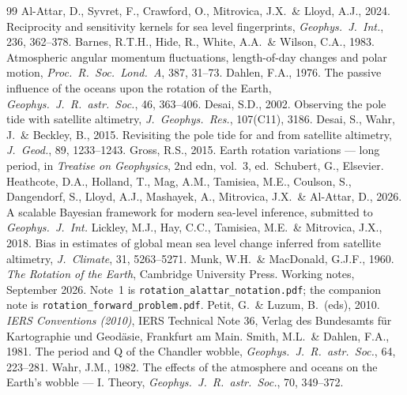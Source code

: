 \documentclass[11pt,a4paper]{article}
\begin{document}
\begin{thebibliography}{99}
 Al-Attar, D., Syvret, F., Crawford, O., Mitrovica, J.X.\ \& Lloyd, A.J., 2024.
Reciprocity and sensitivity kernels for sea level fingerprints, \emph{Geophys.\ J.\ Int.}, 236, 362--378.
 Barnes, R.T.H., Hide, R., White, A.A.\ \& Wilson, C.A., 1983. Atmospheric angular
momentum fluctuations, length-of-day changes and polar motion, \emph{Proc.\ R.\ Soc.\ Lond.\ A}, 387, 31--73.
 Dahlen, F.A., 1976. The passive influence of the oceans upon the rotation of the
Earth, \emph{Geophys.\ J.\ R.\ astr.\ Soc.}, 46, 363--406.
 Desai, S.D., 2002. Observing the pole tide with satellite altimetry, \emph{J.\ Geophys.\
Res.}, 107(C11), 3186.
 Desai, S., Wahr, J.\ \& Beckley, B., 2015. Revisiting the pole tide for and from satellite
altimetry, \emph{J.\ Geod.}, 89, 1233--1243.
 Gross, R.S., 2015. Earth rotation variations --- long period, in \emph{Treatise on
Geophysics}, 2nd edn, vol.~3, ed.\ Schubert, G., Elsevier.
 Heathcote, D.A., Holland, T., Mag, A.M., Tamisiea, M.E., Coulson, S., Dangendorf, S.,
Lloyd, A.J., Mashayek, A., Mitrovica, J.X.\ \& Al-Attar, D., 2026. A scalable Bayesian framework for modern
sea-level inference, submitted to \emph{Geophys.\ J.\ Int.}
 Lickley, M.J., Hay, C.C., Tamisiea, M.E.\ \& Mitrovica, J.X., 2018. Bias in estimates of
global mean sea level change inferred from satellite altimetry, \emph{J.\ Climate}, 31, 5263--5271.
\bibitem{munk} Munk, W.H.\ \& MacDonald, G.J.F., 1960. \emph{The Rotation of the Earth}, Cambridge
University Press.
 Working notes, September 2026. Note~1 is \texttt{rotation\_alattar\_notation.pdf};
the companion note is \texttt{rotation\_forward\_problem.pdf}.
 Petit, G.\ \& Luzum, B.\ (eds), 2010. \emph{IERS Conventions (2010)}, IERS Technical Note 36,
Verlag des Bundesamts f\"ur Kartographie und Geod\"asie, Frankfurt am Main.
\bibitem{sd81} Smith, M.L.\ \& Dahlen, F.A., 1981. The period and Q of the Chandler wobble,
\emph{Geophys.\ J.\ R.\ astr.\ Soc.}, 64, 223--281.
 Wahr, J.M., 1982. The effects of the atmosphere and oceans on the Earth's wobble --- I.
Theory, \emph{Geophys.\ J.\ R.\ astr.\ Soc.}, 70, 349--372.
\end{thebibliography}
\end{document}
